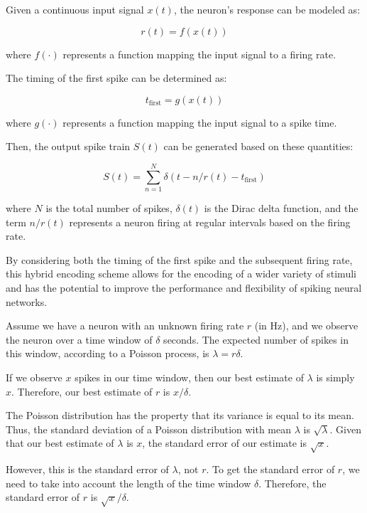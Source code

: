 Given a continuous input signal $x(t)$, the neuron's response can be modeled as:

\begin{equation}
r(t) = f(x(t))
\end{equation}

where $f(\cdot)$ represents a function mapping the input signal to a firing rate.

The timing of the first spike can be determined as:

\begin{equation}
t_{\text{first}} = g(x(t))
\end{equation}

where $g(\cdot)$ represents a function mapping the input signal to a spike time.

Then, the output spike train $S(t)$ can be generated based on these quantities:

\begin{equation}
S(t) = \sum_{n=1}^{N} \delta(t - n/r(t) - t_{\text{first}})
\end{equation}

where $N$ is the total number of spikes, $\delta(t)$ is the Dirac delta function, and the term $n/r(t)$ represents a neuron firing at regular intervals based on the firing rate.

By considering both the timing of the first spike and the subsequent firing rate, this hybrid encoding scheme allows for the encoding of a wider variety of stimuli and has the potential to improve the performance and flexibility of spiking neural networks.


Assume we have a neuron with an unknown firing rate $r$ (in Hz), and we observe the neuron over a time window of $\delta$ seconds. The expected number of spikes in this window, according to a Poisson process, is $\lambda = r \delta$.

If we observe $x$ spikes in our time window, then our best estimate of $\lambda$ is simply $x$. Therefore, our best estimate of $r$ is $x/\delta$.

The Poisson distribution has the property that its variance is equal to its mean. Thus, the standard deviation of a Poisson distribution with mean $\lambda$ is $\sqrt{\lambda}$. Given that our best estimate of $\lambda$ is $x$, the standard error of our estimate is $\sqrt{x}$.

However, this is the standard error of $\lambda$, not $r$. To get the standard error of $r$, we need to take into account the length of the time window $\delta$. Therefore, the standard error of $r$ is $\sqrt{x}/\delta$.

